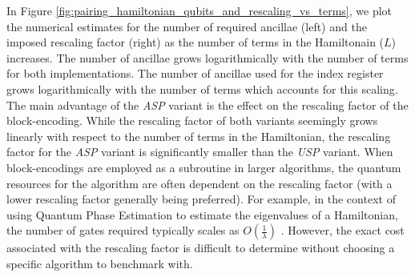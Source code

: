 In Figure \ref{fig:pairing_hamiltonian_qubits_and_rescaling_vs_terms}, we plot the numerical estimates for the number of required ancillae (left) and the imposed rescaling factor (right) as the number of terms in the Hamiltonain ($L$) increases.
The number of ancillae grows logarithmically with the number of terms for both implementations.
The number of ancillae used for the index register grows logarithmically with the number of terms which accounts for this scaling.
The main advantage of the \textit{ASP} variant is the effect on the rescaling factor of the block-encoding.
While the rescaling factor of both variants seemingly grows linearly with respect to the number of terms in the Hamiltonian, the rescaling factor for the \textit{ASP} variant is significantly smaller than the \textit{USP} variant.
When block-encodings are employed as a subroutine in larger algorithms, the quantum resources for the algorithm are often dependent on the rescaling factor (with a lower rescaling factor generally being preferred).
For example, in the context of using Quantum Phase Estimation to estimate the eigenvalues of a Hamiltonian, the number of gates required typically scales as $O(\frac{1}{\lambda})$ \cite{babbush2018encoding}. 
However, the exact cost associated with the rescaling factor is difficult to determine without choosing a specific algorithm to benchmark with.

